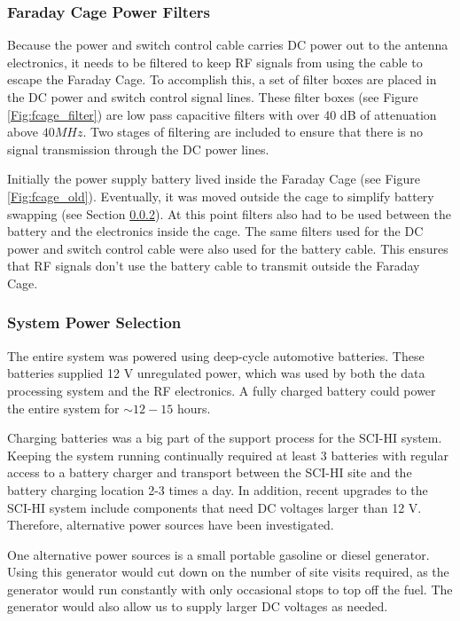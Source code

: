 \subsubsection{Faraday Cage Power Filters}

Because the power and switch control cable carries DC power out to the antenna electronics, it needs to be filtered to keep RF signals from using the cable to escape the Faraday Cage. To accomplish this, a set of filter boxes are placed in the DC power and switch control signal lines. These filter boxes (see Figure \ref{Fig:fcage_filter}) are low pass capacitive filters with over 40 dB of attenuation above $40 MHz$. Two stages of filtering are included to ensure that there is no signal transmission through the DC power lines. 

Initially the power supply battery lived inside the Faraday Cage (see Figure \ref{Fig:fcage_old}). Eventually, it was moved outside the cage to simplify battery swapping (see Section \ref{Sec:sys_power}). At this point filters also had to be used between the battery and the electronics inside the cage. The same filters used for the DC power and switch control cable were also used for the battery cable. This ensures that RF signals don't use the battery cable to transmit outside the Faraday Cage.  

\subsubsection{System Power Selection} \label{Sec:sys_power}

The entire system was powered using deep-cycle automotive batteries. These batteries supplied 12 V unregulated power, which was used by both the data processing system and the RF electronics. A fully charged battery could power the entire system for $\sim12-15$ hours. 

Charging batteries was a big part of the support process for the SCI-HI system. Keeping the system running continually required at least 3 batteries with regular access to a battery charger and transport between the SCI-HI site and the battery charging location 2-3 times a day. In addition, recent upgrades to the SCI-HI system include components that need DC voltages larger than 12 V. Therefore, alternative power sources have been investigated.

One alternative power sources is a small portable gasoline or diesel generator. Using this generator would cut down on the number of site visits required, as the generator would run constantly with only occasional stops to top off the fuel. The generator would also allow us to supply larger DC voltages as needed. 

